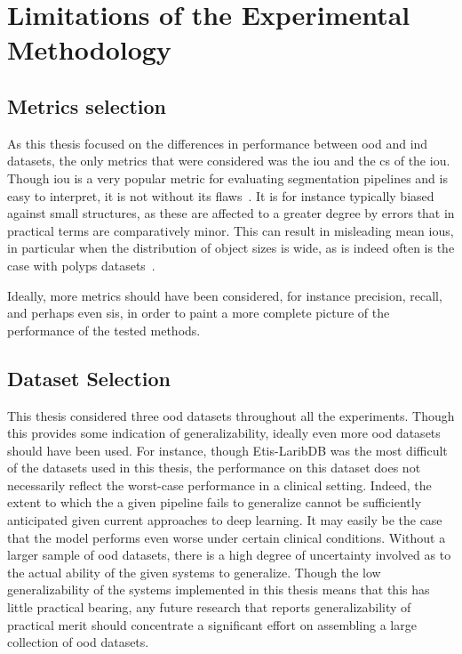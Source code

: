 \section{Limitations of the Experimental Methodology}

\subsection{Metrics selection}

\cite{metric_weakness}
As this thesis focused on the differences in performance between \gls{ood} and \gls{ind} datasets, the only metrics that were considered was the \gls{iou} and the \gls{cs} of the \gls{iou}. Though \gls{iou} is a very popular metric for evaluating segmentation pipelines and is easy to interpret, it is not without its flaws~\cite{metric_weakness}. It is for instance typically biased against small structures, as these are affected to a greater degree by errors that in practical terms are comparatively minor. This can result in misleading mean \glspl{iou}, in particular when the distribution of object sizes is wide, as is indeed often is the case with polyps datasets~\cite{endocv2021_review}.  

Ideally, more metrics should have been considered, for instance precision, recall, and perhaps even \gls{sis}, in order to paint a more complete picture of the performance of the tested methods. 

\subsection{Dataset Selection}
This thesis considered three \gls{ood} datasets throughout all the experiments. Though this provides some indication of generalizability, ideally even more \gls{ood} datasets should have been used. For instance, though Etis-LaribDB was the most difficult of the datasets used in this thesis, the performance on this dataset does not necessarily reflect the worst-case performance in a clinical setting. Indeed, the extent to which the a given pipeline fails to generalize cannot be sufficiently anticipated \cite{trust_ai} given current approaches to deep learning. It may easily be the case that the model performs even worse under certain clinical conditions. Without a larger sample of \gls{ood} datasets, there is a high degree of uncertainty involved as to the actual ability of the given systems to generalize. Though the low generalizability of the systems implemented in this thesis means that this has little practical bearing, any future research that reports generalizability of practical merit should concentrate a significant effort on assembling a large collection of \gls{ood} datasets. 

